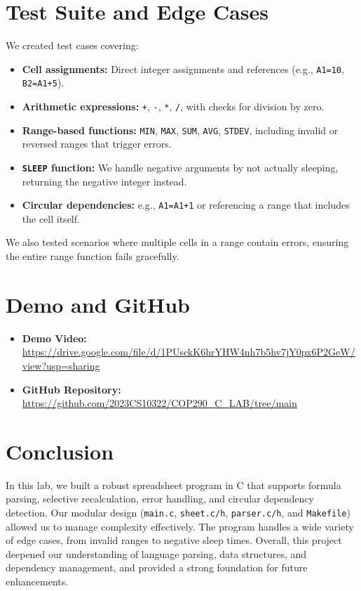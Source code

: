 \documentclass[11pt,a4paper]{article}
\begin{document}
\section{Test Suite and Edge Cases}
We created test cases covering:
\begin{itemize}[noitemsep]
    \item \textbf{Cell assignments:} Direct integer assignments and references (e.g., \texttt{A1=10}, \texttt{B2=A1+5}).
    \item \textbf{Arithmetic expressions:} \texttt{+}, \texttt{-}, \texttt{*}, \texttt{/}, with checks for division by zero.
    \item \textbf{Range-based functions:} \texttt{MIN}, \texttt{MAX}, \texttt{SUM}, \texttt{AVG}, \texttt{STDEV}, including invalid or reversed ranges that trigger errors.
    \item \textbf{\texttt{SLEEP} function:} We handle negative arguments by not actually sleeping, returning the negative integer instead.
    \item \textbf{Circular dependencies:} e.g., \texttt{A1=A1+1} or referencing a range that includes the cell itself.
\end{itemize}
We also tested scenarios where multiple cells in a range contain errors, ensuring the entire range function fails gracefully.

\section{Demo and GitHub}
\begin{itemize}[noitemsep]
    \item \textbf{Demo Video:} \url{https://drive.google.com/file/d/1PUsckK6hrYHW4nh7b5hv7jY0px6P2GeW/view?usp=sharing}
    \item \textbf{GitHub Repository:} \url{https://github.com/2023CS10322/COP290_C_LAB/tree/main}
\end{itemize}

\section{Conclusion}
In this lab, we built a robust spreadsheet program in C that supports formula parsing, selective recalculation, error handling, and circular dependency detection. Our modular design (\texttt{main.c}, \texttt{sheet.c/h}, \texttt{parser.c/h}, and \texttt{Makefile}) allowed us to manage complexity effectively. The program handles a wide variety of edge cases, from invalid ranges to negative sleep times. Overall, this project deepened our understanding of language parsing, data structures, and dependency management, and provided a strong foundation for future enhancements.
\end{document}

